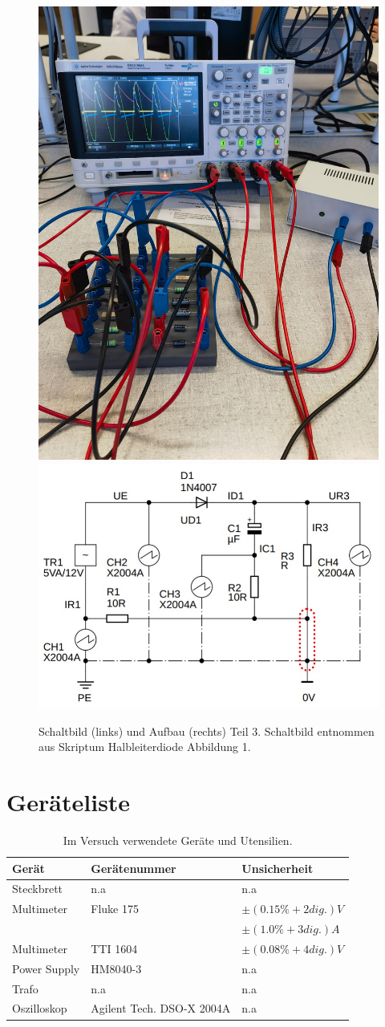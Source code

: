 \documentclass[12pt,a4paper,twoside]{article}
\begin{document}
\begin{figure}[H]
    \centering
    \includegraphics[width=0.4\linewidth]{nudes/3.jpg}
    \includegraphics[width=0.4\linewidth]{nudes/aufbau3 schaltplan.jpg}
    \caption{Schaltbild (links) und Aufbau (rechts) Teil 3. Schaltbild entnommen aus Skriptum Halbleiterdiode Abbildung 1. \cite{teachcenter2}}
    \label{fig:aufbau 3}
\end{figure}

\section{Geräteliste} %

    \begin{table}[H]
        \centering
        \caption{Im Versuch verwendete Geräte und Utensilien.}
        \label{tab:geraete}
        \begin{tabular}{| l | l | l |}
            \hline
            Gerät   & Gerätenummer  & Unsicherheit \\
            \hline
            Steckbrett & {n.a} & {n.a} \\
            Multimeter & Fluke 175 & $\pm (0.15\% + 2 dig.) V$ \\
            & & $\pm (1.0\% + 3 dig.) A$ \cite{fluke}\\
            Multimeter & TTI 1604 & $\pm (0.08\% + 4 dig.) V$ \cite{TTI} \\
            Power Supply & HM8040-3 & {n.a}\\
            Trafo & {n.a} & {n.a}\\
            Oszilloskop & Agilent Tech. DSO-X 2004A & {n.a}\\
            \hline
        \end{tabular}
    \end{table}
\end{document}
